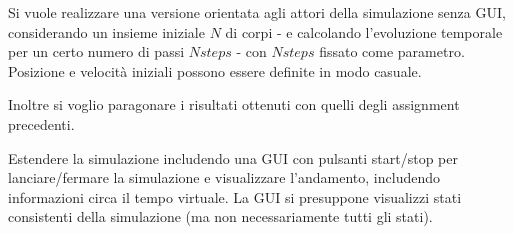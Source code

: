 \documentclass[12pt,a4paper,openright,twoside]{book}
\begin{document}
Si vuole realizzare una versione orientata agli attori della simulazione senza GUI, considerando un insieme iniziale $N$ di corpi
- e calcolando l'evoluzione temporale per un certo numero di passi $Nsteps$ -
con $Nsteps$ fissato come parametro. Posizione e velocità iniziali possono essere definite in modo casuale.

Inoltre si voglio paragonare i risultati ottenuti con quelli degli assignment precedenti.

Estendere la simulazione includendo una GUI con pulsanti start/stop per lanciare/fermare la simulazione e visualizzare l'andamento,
includendo informazioni circa il tempo virtuale.
La GUI si presuppone visualizzi stati consistenti della simulazione (ma non necessariamente tutti gli stati).

\end{document}
